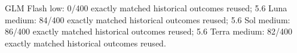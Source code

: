 GLM Flash low: 0/400 exactly matched historical outcomes reused; 5.6 Luna medium: 84/400 exactly matched historical outcomes reused; 5.6 Sol medium: 86/400 exactly matched historical outcomes reused; 5.6 Terra medium: 82/400 exactly matched historical outcomes reused.
